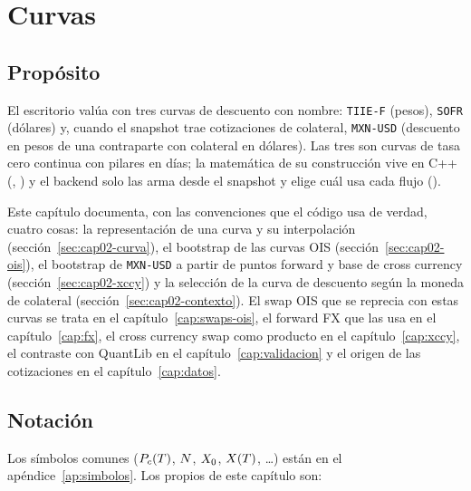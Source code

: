 \chapter{Curvas}\label{cap:curvas}

\section{Propósito}\label{sec:cap02-proposito}

El escritorio valúa con tres curvas de descuento con nombre: \texttt{TIIE-F} (pesos), \texttt{SOFR} (dólares) y,
cuando el snapshot trae cotizaciones de colateral, \texttt{MXN-USD} (descuento en pesos de una contraparte con
colateral en dólares). Las tres son curvas de tasa cero continua con pilares en días; la matemática de su
construcción vive en C++ (,
) y el backend solo las arma desde el
snapshot y elige cuál usa cada flujo ().

Este capítulo documenta, con las convenciones que el código usa de verdad, cuatro cosas: la representación de una
curva y su interpolación (sección~\ref{sec:cap02-curva}), el bootstrap de las curvas OIS
(sección~\ref{sec:cap02-ois}), el bootstrap de \texttt{MXN-USD} a partir de puntos forward y base de cross
currency (sección~\ref{sec:cap02-xccy}) y la selección de la curva de descuento según la moneda de colateral
(sección~\ref{sec:cap02-contexto}). El swap OIS que se reprecia con estas curvas se trata en el
capítulo~\ref{cap:swaps-ois}, el forward FX que las usa en el capítulo~\ref{cap:fx}, el cross currency swap como
producto en el capítulo~\ref{cap:xccy}, el contraste con QuantLib en el capítulo~\ref{cap:validacion} y el origen de
las cotizaciones en el capítulo~\ref{cap:datos}.

\section{Notación}\label{sec:cap02-notacion}

Los símbolos comunes ($P_{c}(T)$, $N$, $X_0$, $X(T)$, \dots) están en el apéndice~\ref{ap:simbolos}. Los
propios de este capítulo son:

